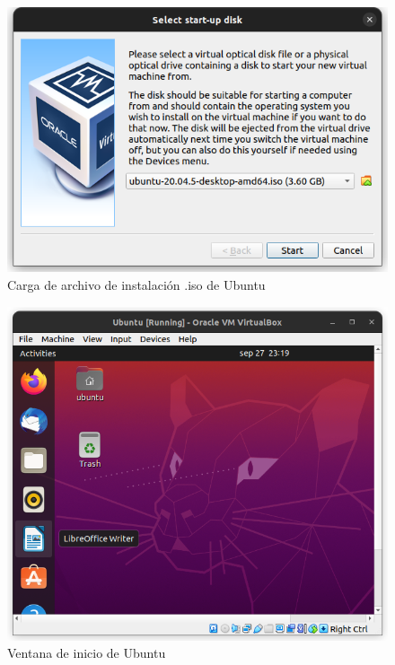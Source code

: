 \documentclass{article}
\begin{document}
        \begin{figure}[!htbp]
            \centering
            \includegraphics[scale=0.4]{img/ubuntu-install.png}
            \caption{Carga de archivo de instalación .iso de Ubuntu}
            \label{fig:ubuntu-iso-load}
        \end{figure}

        \begin{figure}[!htbp]
            \centering
            \includegraphics[scale=0.4]{img/ubuntu-init.png}
            \caption{Ventana de inicio de Ubuntu}
            \label{fig:ubuntu-init}
        \end{figure}
\end{document}
